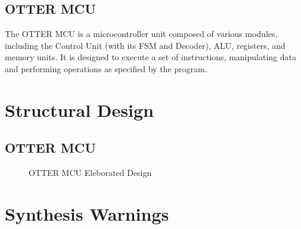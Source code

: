 \documentclass[
    a4paper, %
	12pt, %
    ]{CSSullivanBusinessReport}
\begin{document}
\begin{fullwidth}
\subsection{OTTER MCU}
The OTTER MCU is a microcontroller unit composed of various modules, including the Control Unit (with its FSM and Decoder), ALU, registers, and memory units. It is designed to execute a set of instructions, manipulating data and performing operations as specified by the program.



\section{Structural Design} %

\subsection{OTTER MCU} %

\begin{figure}[H]
    \centering
    \captionsetup{style=widetable}
    \caption{OTTER MCU Eleborated Design}
    \label{fig:MCUschematic}
\end{figure}

\section{Synthesis Warnings} %


\end{fullwidth}
\end{document}
